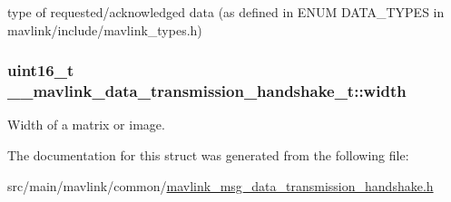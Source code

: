 type of requested/acknowledged data (as defined in E\+N\+U\+M D\+A\+T\+A\+\_\+\+T\+Y\+P\+E\+S in mavlink/include/mavlink\+\_\+types.\+h) 

\hypertarget{struct____mavlink__data__transmission__handshake__t_a6550eca37edfa6254a10b0900ed591ac}{
\subsubsection[{width}]{\setlength{\rightskip}{0pt plus 5cm}uint16\+\_\+t \+\_\+\+\_\+mavlink\+\_\+data\+\_\+transmission\+\_\+handshake\+\_\+t\+::width}}\label{struct____mavlink__data__transmission__handshake__t_a6550eca37edfa6254a10b0900ed591ac}


Width of a matrix or image. 



The documentation for this struct was generated from the following file\+:\begin{DoxyCompactItemize}
\item 
src/main/mavlink/common/\hyperlink{mavlink__msg__data__transmission__handshake_8h}{mavlink\+\_\+msg\+\_\+data\+\_\+transmission\+\_\+handshake.\+h}\end{DoxyCompactItemize}
